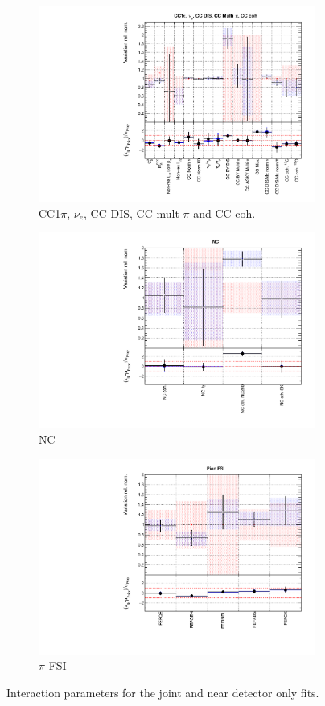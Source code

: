 \begin{figure}
\begin{subfigure}{0.49\textwidth}
  \centering
  \includegraphics[width=0.9\linewidth]{figs/jointxsec3}
  \caption{CC1$\pi$, $\nu_e$, CC DIS, CC mult-$\pi$ and CC coh.}
\end{subfigure}
\begin{subfigure}{0.45\textwidth}
  \centering
  \includegraphics[width=0.9\linewidth]{figs/jointxsec4}
  \caption{NC}
\end{subfigure}
\begin{subfigure}{0.49\textwidth}
  \centering
  \includegraphics[width=0.9\linewidth]{figs/jointxsec5}
  \caption{$\pi$ FSI}
\end{subfigure}
\caption{Interaction parameters for the joint and near detector only fits.}
\label{fig:jointxsec}
\end{figure}

